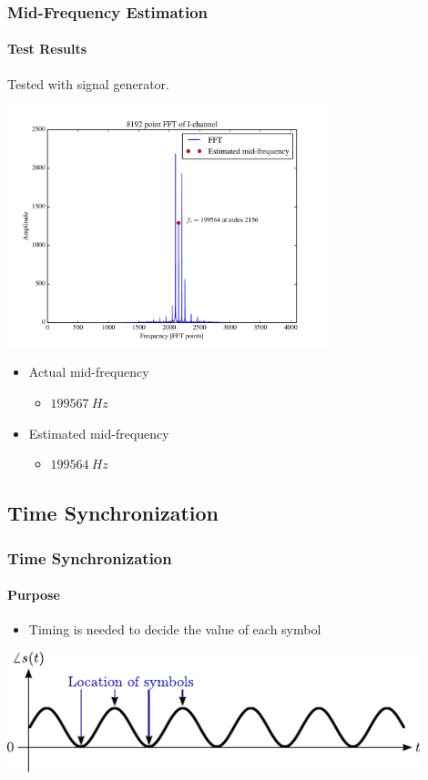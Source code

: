 \begin{frame} \frametitle{Mid-Frequency Estimation}
    \framesubtitle{Test Results}
    Tested with signal generator.
    \begin{center}
        \includegraphics[width=0.7\textwidth]{img/fft_dsp}
    \end{center}
    \begin{itemize}
        \item Actual mid-frequency
            \begin{itemize}
                \item $\SI{199567}{Hz}$
            \end{itemize}
        \item Estimated mid-frequency
            \begin{itemize}
                \item $\SI{199564}{Hz}$
            \end{itemize}
    \end{itemize}
\end{frame}


\subsection{Time Synchronization} \label{sec:finaltest}

\begin{frame} \frametitle{Time Synchronization}
    \framesubtitle{Purpose}
    \begin{itemize}
        \item Timing is needed to decide the value of each symbol
    \end{itemize}
    \begin{center}
        \vspace{1cm}
        \includegraphics[width=0.9\textwidth]{img/time_sync_purp}
    \end{center}
\end{frame}

